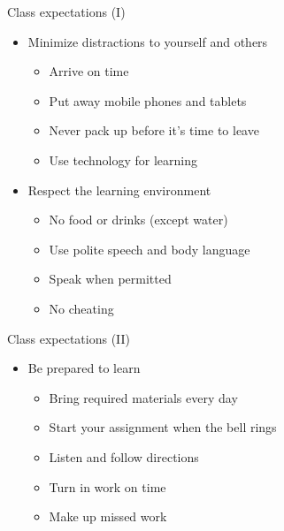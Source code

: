 \documentclass[aspectratio=169]{beamer}
\begin{document}
\begin{frame}{Class expectations (I)}
    \begin{itemize}[label=--]
        \item Minimize distractions to yourself and others
            \begin{itemize}[label=\(\blacktriangleright\),itemsep=5pt]
                \item Arrive on time
                \item Put away mobile phones and tablets
                \item Never pack up before it's time to leave
                \item Use technology for learning
            \end{itemize}
        \item Respect the learning environment
            \begin{itemize}[label=\(\blacktriangleright\),itemsep=5pt]
                \item No food or drinks (except water)
                \item Use polite speech and body language
                \item Speak when permitted
                \item No cheating
            \end{itemize}
    \end{itemize}
\end{frame}


\begin{frame}{Class expectations (II)}
    \begin{itemize}[label=--]
        \item Be prepared to learn
            \begin{itemize}[label=\(\blacktriangleright\),itemsep=5pt]
                \item Bring required materials every day
                \item Start your assignment when the bell rings
                \item Listen and follow directions
                \item Turn in work on time
                \item Make up missed work
            \end{itemize}
    \end{itemize}
\end{frame}
\end{document}

